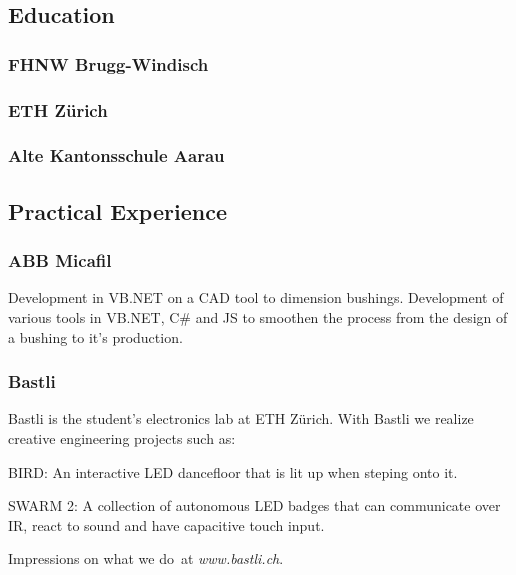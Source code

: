 \documentclass[]{resume}
\begin{document}
\begin{timeline}


\subsection{Education}

\subsubsection{FHNW Brugg-Windisch}
\sectionsep

\subsubsection{ETH Zürich}
\sectionsep

\subsubsection{Alte Kantonsschule Aarau}
\sectionsep


\subsection{Practical Experience}

\subsubsection{ABB Micafil}
Development in VB.NET on a CAD tool to dimension bushings.
Development of various tools in VB.NET, C\# and JS to smoothen the process from the design of a bushing to it's production.
\sectionsep

\subsubsection{Bastli}
Bastli is the student's electronics lab at ETH Zürich.
With Bastli we realize creative engineering projects such as:
\vspace{\topsep} %
\begin{tightemize}
\item BIRD: An interactive LED dancefloor that is lit up when steping onto it. 
\item SWARM 2: A collection of autonomous LED badges that can communicate over IR, react to sound and have capacitive touch input.
\end{tightemize}
Impressions on what we do at \textit{www.bastli.ch}.
\sectionsep


\end{timeline}
\end{document}
